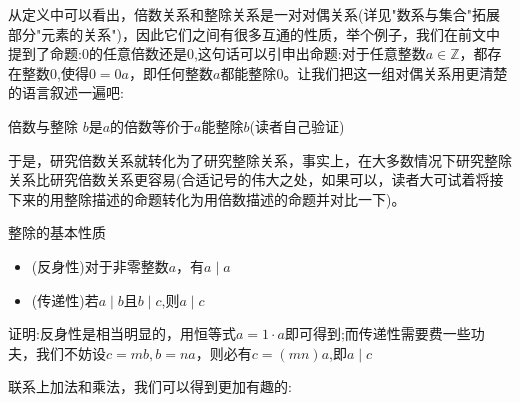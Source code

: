 从定义中可以看出，倍数关系和整除关系是一对对偶关系(详见"数系与集合"拓展部分"元素的关系")，因此它们之间有很多互通的性质，举个例子，我们在前文中提到了命题:$0$的任意倍数还是$0$,这句话可以引申出命题:对于任意整数$a\in \mathbb{Z}$，都存在整数$0$,使得$0=0a$，即任何整数$a$都能整除$0$。让我们把这一组对偶关系用更清楚的语言叙述一遍吧:
\begin{exercise}{倍数与整除}
$b$是$a$的倍数等价于$a$能整除$b$(读者自己验证)
\end{exercise}

于是，研究倍数关系就转化为了研究整除关系，事实上，在大多数情况下研究整除关系比研究倍数关系更容易(合适记号的伟大之处，如果可以，读者大可试着将接下来的用整除描述的命题转化为用倍数描述的命题并对比一下)。

\begin{example}{整除的基本性质}
\begin{itemize}
\item (反身性)对于非零整数$a$，有$a\mid a$
\item (传递性)若$a\mid b$且$b\mid c$,则$a\mid c$
\end{itemize}
\end{example}
证明:反身性是相当明显的，用恒等式$a=1\cdot a$即可得到;而传递性需要费一些功夫，我们不妨设$c=mb,b=na$，则必有$c=(mn)a$,即$a\mid c$

联系上加法和乘法，我们可以得到更加有趣的:

